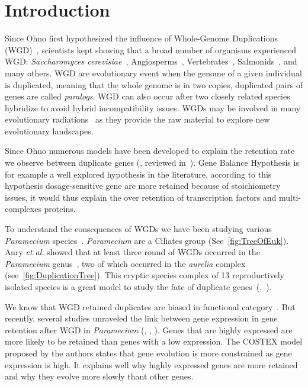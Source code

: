 \section*{Introduction}
\label{sec:Introduction}

Since Ohno first hypothesized the influence of Whole-Genome Duplications (WGD)~\citep{ohno_enormous_1970}, scientists kept showing that a broad number of organisms experienced WGD: \textit{Saccharomyces cerevisiae}~\citep{kellis_proof_2004}, Angiosperms~\citep{arrigo_rarely_2012}, Vertebrates~\citep{dehal_two_2005}, Salmonids~\citep{alexandrou_genome_2013}, and many others. WGD are evolutionary event when the genome of a given individual is duplicated, meaning that the whole genome is in two copies, duplicated pairs of genes are called \textit{paralogs}. WGD can also occur after two closely related species hybridize to avoid hybrid incompatibility issues. WGDs may be involved in many evolutionary radiations~\citep{alexandrou_genome_2013} as they provide the raw material to explore new evolutionary landscapes.

Since Ohno numerous models have been developed to explain the retention rate we observe between duplicate genes (\citet{chain_odds_2011}, reviewed in~\citet{innan_evolution_2010}). Gene Balance Hypothesis is for example a well explored hypothesis in the literature, according to this hypothesis dosage-sensitive gene are more retained because of stoichiometry issues, it would thus explain the over retention of transcription factors and multi-complexes proteins.

To understand the consequences of WGDs we have been studying various \textit{Paramecium} species~\citep{beisson_paramecium_2010}. \textit{Paramecium} are a Ciliates group (See~\autoref{fig:TreeOfEuk}). Aury \textit{et al.} showed that at least three round of WGDs occurred in the \textit{Paramecium} genus~\citep{aury_global_2006}, two of which occurred in the \textit{aurelia} complex (see~\autoref{fig:DuplicationTree}). This cryptic species complex of 13 reproductively isolated species is a great model to study the fate of duplicate genes~(\citealt{catania_genetic_2009},~\citealt{mcgrath_insights_2014}).

We know that WGD retained duplicates are biased in functional category~\citep{edger_gene_2009}. But recently, several studies unraveled the link between gene expression in gene retention after WGD in \textit{Paramecium} (\citealt{gout_relationship_2010}, \citealt{arnaiz_gene_2010}, \citealt{chain_odds_2011}). Genes that are highly expressed are more likely to be retained than genes with a low expression. The COSTEX model proposed by the authors states that gene evolution is more constrained as gene expression is high. It explains well why highly expressed genes are more retained and why they evolve more slowly thant other genes.

